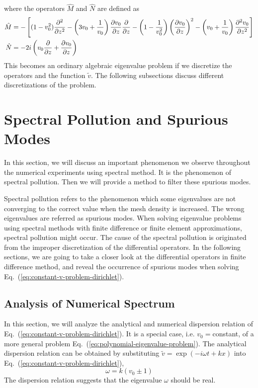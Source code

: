 where the operators $\hat{M}$ and $\hat{N}$ are defined as
\begin{align*}
	\hat{M} & = -\left[(1-v_0^2)\pdv[2]{}{z}
		-\left(3v_0 + \frac{1}{v_0}\right)\pdv{v_0}{z}\pdv{}{z}
		- \left(1-\frac{1}{v_0^2}\right)\left(\pdv{v_0}{z}\right)^2
	- \left(v_0+\frac{1}{v_0}\right)\pdv[2]{v_0}{z}\right]  \\
	\hat{N} & = -2i\left(v_0\pdv{}{z} +\pdv{v_0}{z} \right)
\end{align*}
This becomes an ordinary algebraic eigenvalue problem if we discretize the operators and the function $\tilde{v}$. The following subsections discuss different discretizations of the problem.

\section{Spectral Pollution and Spurious Modes}
In this section, we will discuss an important phenomenon we observe throughout the numerical experiments using spectral method. It is the phenomenon of spectral pollution. Then we will provide a method to filter these spurious modes.

Spectral pollution refers to the phenomenon which some eigenvalues are not converging to the correct value when the mesh density is increased. The wrong eigenvalues are referred as spurious modes. When solving eigenvalue problems using spectral methods with finite difference or finite element approximations, spectral pollution might occur. \cite{llobet_spectral_1990} The cause of the spectral pollution is originated from the improper discretization of the differential operators. In the following sections, we are going to take a closer look at the differential operators in finite difference method, and reveal the occurrence of spurious modes when solving Eq.~(\ref{eq:constant-v-problem-dirichlet}).

\subsection{Analysis of Numerical Spectrum}
In this section, we will analyze the analytical and numerical dispersion relation of Eq.~(\ref{eq:constant-v-problem-dirichlet}). It is a special case, i.e. $v_0=$constant, of a more general problem Eq.~(\ref{eq:polynomial-eigenvalue-problem}). The analytical dispersion relation can be obtained by substituting $\tilde{v} = \exp(-i\omega t + kx)$ into Eq.~(\ref{eq:constant-v-problem-dirichlet}),
\begin{equation} \label{dispersion-relation}
	\omega = k(v_0 \pm 1)
\end{equation}
The dispersion relation suggests that the eigenvalue $\omega$ should be real.

